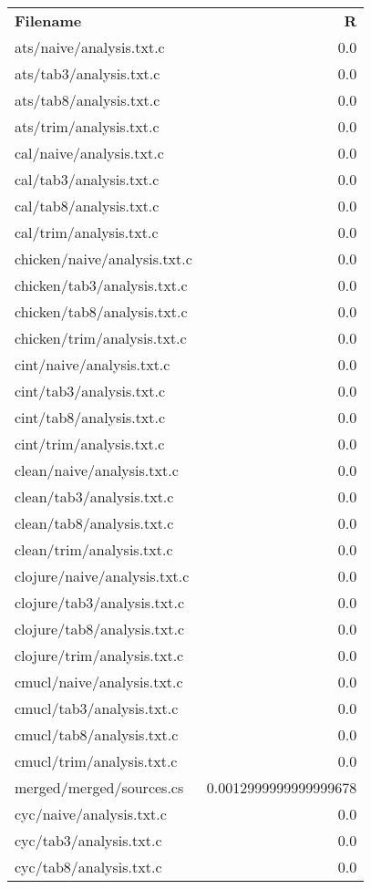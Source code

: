 \begin{longtable}{l r}
\textbf{Filename} &  \textbf{R} \\
{ats/naive/analysis.txt.c} & 0.0  \\
{ats/tab3/analysis.txt.c} & 0.0  \\
{ats/tab8/analysis.txt.c} & 0.0  \\
{ats/trim/analysis.txt.c} & 0.0  \\
{cal/naive/analysis.txt.c} & 0.0  \\
{cal/tab3/analysis.txt.c} & 0.0  \\
{cal/tab8/analysis.txt.c} & 0.0  \\
{cal/trim/analysis.txt.c} & 0.0  \\
{chicken/naive/analysis.txt.c} & 0.0  \\
{chicken/tab3/analysis.txt.c} & 0.0  \\
{chicken/tab8/analysis.txt.c} & 0.0  \\
{chicken/trim/analysis.txt.c} & 0.0  \\
{cint/naive/analysis.txt.c} & 0.0  \\
{cint/tab3/analysis.txt.c} & 0.0  \\
{cint/tab8/analysis.txt.c} & 0.0  \\
{cint/trim/analysis.txt.c} & 0.0  \\
{clean/naive/analysis.txt.c} & 0.0  \\
{clean/tab3/analysis.txt.c} & 0.0  \\
{clean/tab8/analysis.txt.c} & 0.0  \\
{clean/trim/analysis.txt.c} & 0.0  \\
{clojure/naive/analysis.txt.c} & 0.0  \\
{clojure/tab3/analysis.txt.c} & 0.0  \\
{clojure/tab8/analysis.txt.c} & 0.0  \\
{clojure/trim/analysis.txt.c} & 0.0  \\
{cmucl/naive/analysis.txt.c} & 0.0  \\
{cmucl/tab3/analysis.txt.c} & 0.0  \\
{cmucl/tab8/analysis.txt.c} & 0.0  \\
{cmucl/trim/analysis.txt.c} & 0.0  \\
{merged/merged/sources.cs} & 0.0012999999999999678  \\
{cyc/naive/analysis.txt.c} & 0.0  \\
{cyc/tab3/analysis.txt.c} & 0.0  \\
{cyc/tab8/analysis.txt.c} & 0.0  \\

\end{longtable}
